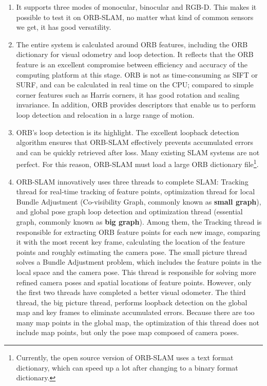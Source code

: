 \begin{enumerate}
	\item It supports three modes of monocular, binocular and RGB-D. This makes it possible to test it on ORB-SLAM, no matter what kind of common sensors we get, it has good versatility.
	\item The entire system is calculated around ORB features, including the ORB dictionary for visual odometry and loop detection. It reflects that the ORB feature is an excellent compromise between efficiency and accuracy of the computing platform at this stage. ORB is not as time-consuming as SIFT or SURF, and can be calculated in real time on the CPU; compared to simple corner features such as Harris corners, it has good rotation and scaling invariance. In addition, ORB provides descriptors that enable us to perform loop detection and relocation in a large range of motion.
	\item ORB's loop detection is its highlight. The excellent loopback detection algorithm ensures that ORB-SLAM effectively prevents accumulated errors and can be quickly retrieved after loss. Many existing SLAM systems are not perfect. For this reason, ORB-SLAM must load a large ORB dictionary \mbox{file}\footnote{Currently, the open source version of ORB-SLAM uses a text format dictionary, which can speed up a lot after changing to a binary format dictionary. }.
	\item ORB-SLAM innovatively uses three threads to complete SLAM: Tracking thread for real-time tracking of feature points, optimization thread for local Bundle Adjustment (Co-visibility Graph, commonly known as \textbf{small graph}), and global pose graph loop detection and optimization thread (essential graph, commonly known as \textbf{big graph}). Among them, the Tracking thread is responsible for extracting ORB feature points for each new image, comparing it with the most recent key frame, calculating the location of the feature points and roughly estimating the camera pose. The small picture thread solves a Bundle Adjustment problem, which includes the feature points in the local space and the camera pose. This thread is responsible for solving more refined camera poses and spatial locations of feature points. However, only the first two threads have completed a better visual odometer. The third thread, the big picture thread, performs loopback detection on the global map and key frames to eliminate accumulated errors. Because there are too many map points in the global map, the optimization of this thread does not include map points, but only the pose map composed of camera poses.
	

\end{enumerate}
